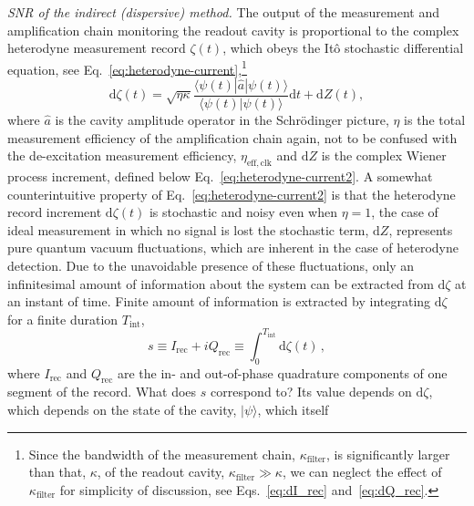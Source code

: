 \documentclass[
						superscriptaddress, 																 amsmath, amssymb,
		 aps,  prb,  
										floatfix,
		linenumbers,
			]{revtex4-1}
\begin{document}
\emph{SNR of the indirect (dispersive) method.}  The output of the
measurement and amplification chain monitoring the readout cavity
is proportional to the complex heterodyne measurement record $\zeta\left(t\right)$,
which obeys the It\^{o} stochastic differential equation, see Eq.~\eqref{eq:heterodyne-current},\footnote{Since the bandwidth of the measurement chain, $\kappa_{\mathrm{filter}}$,
is significantly larger than that, $\kappa$, of the readout cavity,
$\kappa_{\mathrm{filter}}\gg\kappa$, we can neglect the effect of
$\kappa_{\mathrm{filter}}$ for simplicity of discussion, see Eqs.~\eqref{eq:dI_rec}
and~\eqref{eq:dQ_rec}. } 
\begin{equation}
\mathrm{d}\zeta\left(t\right)=\sqrt{\eta\kappa}\frac{\langle\psi\left(t\right)|\hat{a}|\psi\left(t\right)\rangle}{\langle\psi\left(t\right)|\psi\left(t\right)\rangle}\mathrm{d}t+\mathrm{d}Z\left(t\right),\label{eq:heterodyne-current2}
\end{equation}
where $\hat{a}$ is the cavity amplitude operator in the Schr\"{o}dinger
picture, $\eta$ is the total measurement efficiency of the amplification
chain \textemdash{} again, not to be confused with the de-excitation
measurement efficiency, $\eta_{\mathrm{eff,clk}}$ \textemdash{} and
$\mathrm{d}Z$ is the complex Wiener process increment, defined below
Eq.~\eqref{eq:heterodyne-current2}. A somewhat counterintuitive
property of Eq.~\eqref{eq:heterodyne-current2} is that  the heterodyne
record increment $\mathrm{d}\zeta\left(t\right)$ is stochastic and
noisy even when $\eta=1$, the case of ideal measurement in which
no signal is lost \textemdash{} the stochastic term, $\mathrm{d}Z$,
represents pure quantum vacuum fluctuations, which are inherent in
the case of heterodyne detection.\cite{Carmichael1993,Plenio1998,wiseman2010book}
Due to the unavoidable presence of these fluctuations, only an infinitesimal
amount of information about the system can be extracted from $\mathrm{d}\zeta$
at an instant of time. Finite amount of information is extracted by
integrating $\mathrm{d}\zeta$ for a finite duration $T_{\mathrm{int}}$,
\begin{equation}
s\equiv I_{\mathrm{rec}}+iQ_{\mathrm{rec}}\equiv\int_{0}^{T_{\mathrm{int}}}\mathrm{d}\zeta\left(t\right)\,,\label{eq:s=00003D}
\end{equation}
where $I_{\mathrm{rec}}$ and $Q_{\mathrm{rec}}$ are the in- and
out-of-phase quadrature components of one segment of the record. What
does $s$ correspond to? Its value depends on $\mathrm{d}\zeta$,
which depends on the state of the cavity, $|\psi\rangle$, which itself
\end{document}
